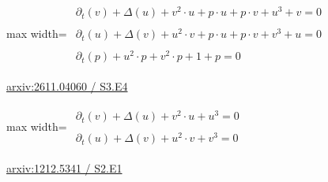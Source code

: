 \documentclass[UTF8,10pt,a4paper,fontset=mac]{ctexart}
\begin{document}
\begin{minipage}{\linewidth}\begin{center}\begin{adjustbox}{max width=\linewidth}$\displaystyle\begin{gathered}\begin{gathered}\partial_{t}(v)+\Delta(u)+v^{2}\cdot u+p\cdot u+p\cdot v+u^{3}+v=0\end{gathered}\\[5pt]\begin{gathered}\partial_{t}(u)+\Delta(v)+u^{2}\cdot v+p\cdot u+p\cdot v+v^{3}+u=0\end{gathered}\\[5pt]\begin{gathered}\partial_{t}(p)+u^{2}\cdot p+v^{2}\cdot p+1+p=0\end{gathered}\end{gathered}$\end{adjustbox}\end{center}{\small\href{https://arxiv.org/html/2611.04060#S3.E4}{arxiv:2611.04060 / S3.E4}}\par\end{minipage}\par\vspace{6mm}

\begin{minipage}{\linewidth}\begin{center}\begin{adjustbox}{max width=\linewidth}$\displaystyle\begin{gathered}\begin{gathered}\partial_{t}(v)+\Delta(u)+v^{2}\cdot u+u^{3}=0\end{gathered}\\[5pt]\begin{gathered}\partial_{t}(u)+\Delta(v)+u^{2}\cdot v+v^{3}=0\end{gathered}\end{gathered}$\end{adjustbox}\end{center}{\small\href{https://arxiv.org/html/1212.5341#S2.E1}{arxiv:1212.5341 / S2.E1}}\par\end{minipage}\par\vspace{6mm}
\end{document}
